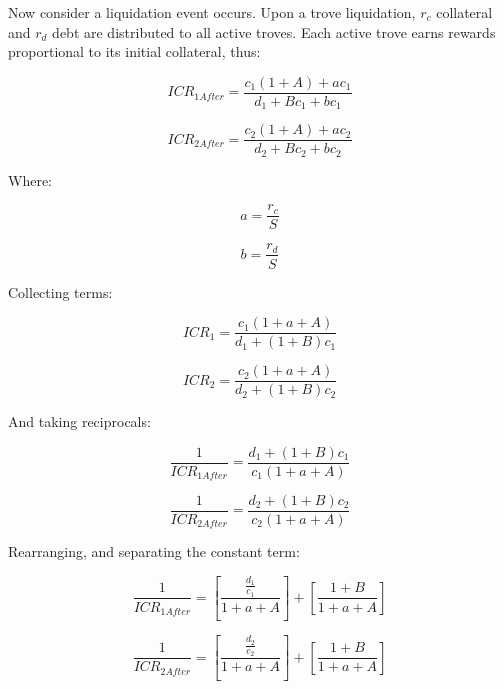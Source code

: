 \documentclass[reqno]{article}
\begin{document}
Now consider a liquidation event occurs. Upon a trove liquidation, $r_c$ collateral and $r_d$ debt are distributed to all active troves. Each active trove earns rewards proportional to its initial collateral, thus:

\begin{equation} 
    ICR_{1After}=\frac{c_1\left(1+A\right)+ac_1}{d_1+Bc_1+bc_1}
\end{equation}

\begin{equation} 
    ICR_{2After}=\frac{c_2\left(1+A\right)+ac_2}{d_2+Bc_2+bc_2}
\end{equation}

\bigskip
Where:

\begin{equation} 
    a=\frac{r_c}{S}
\end{equation}

\begin{equation} 
    b=\frac{r_d}{S}
\end{equation}

\bigskip
Collecting terms:

\begin{equation} 
    ICR_1=\frac{c_1\left(1+a+A\right)}{d_1+\left(1+B\right)c_1}
\end{equation}

\begin{equation} 
    ICR_2=\frac{c_2\left(1+a+A\right)}{d_2+\left(1+B\right)c_2}
\end{equation}

\bigskip
And taking reciprocals:

\begin{equation} 
    \frac{1}{ICR_{1After}}=\frac{d_1+\left(1+B\right)c_1}{c_1\left(1+a+A\right)}
\end{equation}

\begin{equation} 
    \frac{1}{ICR_{2After}}=\frac{d_2+\left(1+B\right)c_2}{c_2\left(1+a+A\right)}
\end{equation}

\bigskip
Rearranging, and separating the constant term:

\begin{equation} 
    \frac{1}{ICR_{1After}}=\left[\frac{\frac{d_1}{c_1}}{1+a+A}\right]+\left[\frac{1+B}{1+a+A}\right]
\end{equation}

\begin{equation} 
    \frac{1}{ICR_{2After}}=\left[\frac{\frac{d_2}{c_2}}{1+a+A}\right]+\left[\frac{1+B}{1+a+A}\right]
\end{equation}
\end{document}
